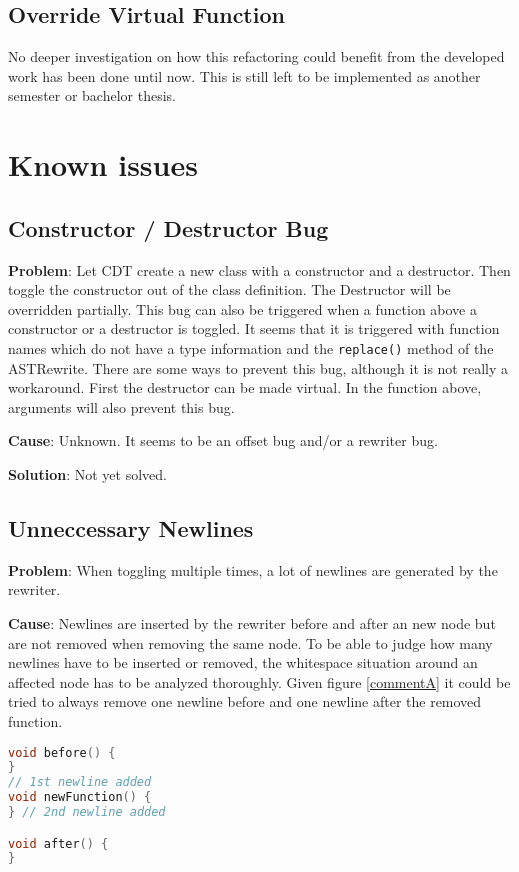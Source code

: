 \subsection{Override Virtual Function}
No deeper investigation on how this refactoring could benefit from the developed 
work has been done until now. This is still left to be implemented as another
semester or bachelor thesis.

\section{Known issues}

\subsection{Constructor / Destructor Bug}\label{ctorBug}
\textbf{Problem}: Let CDT create a new class with a constructor and a destructor. 
Then toggle the constructor out of the class definition. The Destructor will be 
overridden partially. This bug can also be triggered when a function above a
constructor or a destructor is toggled. It seems that it is triggered with
function names which do not have a type information and the \texttt{replace()}
method of the ASTRewrite.
There are some ways to prevent this bug, although it is not really a workaround.
First the destructor can be made virtual. In the function above, arguments will
also prevent this bug.

\textbf{Cause}: Unknown. It seems to be an offset bug and/or a rewriter bug.

\textbf{Solution}: Not yet solved.

\label{newlines}
\subsection{Unneccessary Newlines}
\textbf{Problem}: When toggling multiple times, a lot of newlines are generated 
by the rewriter. 

\textbf{Cause}: Newlines are inserted by the rewriter before and after an new
node but are not removed when removing the same node. To be able to judge how 
many newlines have to be inserted or removed, the whitespace situation around an 
affected node has to be analyzed thoroughly. Given figure \ref{commentA} it 
could be tried to always remove one newline before and one newline after the 
removed function.

\begin{lstlisting}[caption={Whitespaces will not be removed blindly},
label={commentA}, language=C++]
void before() {
}
// 1st newline added
void newFunction() {
} // 2nd newline added

void after() {
}
\end{lstlisting}

